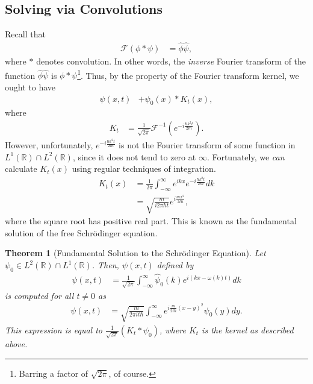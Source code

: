 \documentclass[12pt]{extarticle}
\newcommand{\R}{\mathbb{R}}
\theoremstyle{plain}
\newtheorem*{theorem}{Theorem}%
\theoremstyle{definition}
\theoremstyle{remark}
\begin{document}
  \subsection{Solving via Convolutions}%
  Recall that
  \begin{align*}
    \mathcal{F}(\phi \ast \psi) &= \hat{\phi}\hat{\psi},
  \end{align*}
  where $\ast$ denotes convolution. In other words, the \textit{inverse} Fourier transform of the function $\hat{\phi}\hat{\psi}$ is $\phi \ast \psi$\footnote{Barring a factor of $\sqrt{2\pi}$, of course.}. Thus, by the property of the Fourier transform kernel, we ought to have
  \begin{align*}
    \psi(x,t) &+ \psi_0(x)\ast K_t(x),
  \end{align*}
  where
  \begin{align*}
    K_t &= \frac{1}{\sqrt{2\pi}}\mathcal{F}^{-1}\left(e^{-i\frac{\hbar k^2 t}{2m}}\right).
  \end{align*}
  However, unfortunately, $e^{-i\frac{\hbar k^2 t}{2m}}$ is not the Fourier transform of some function in $L^{1}(\R)\cap L^{2}(\R)$, since it does not tend to zero at $\infty$. Fortunately, we \textit{can} calculate $K_t(x)$ using regular techniques of integration.
  \begin{align*}
    K_t(x) &= \frac{1}{2\pi}\int_{-\infty}^{\infty}e^{ikx}e^{-i\frac{\hbar k^2t}{2m}}dk\\
           &= \sqrt{\frac{m}{i2\pi \hbar t}}e^{i\frac{mx^2}{2t\hbar}},
  \end{align*}
  where the square root has positive real part. This is known as the fundamental solution of the free Schrödinger equation.
  \begin{theorem}[Fundamental Solution to the Schrödinger Equation]
    Let $\psi_0\in L^{2}(\R)\cap L^{1}(\R)$. Then, $\psi(x,t)$ defined by
    \begin{align*}
      \psi(x,t) &= \frac{1}{\sqrt{2\pi}} \int_{-\infty}^{\infty} \hat{\psi}_0(k)e^{i(kx - \omega(k)t)} dk
    \end{align*}
    is computed for all $t\neq 0$ as
    \begin{align*}
      \psi(x,t) &= \sqrt{\frac{m}{2\pi i t\hbar}}\int_{-\infty}^{\infty} e^{i\frac{m}{2t\hbar}(x-y)^2}\psi_0(y) dy.
    \end{align*}
    This expression is equal to $\frac{1}{\sqrt{2\pi}}\left(K_t\ast \psi_0\right)$, where $K_t$ is the kernel as described above.
  \end{theorem}
\end{document}
